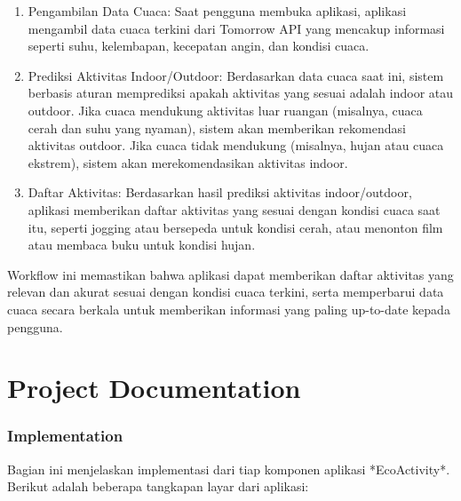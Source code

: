 \documentclass[journal,article,submit,pdftex,moreauthors]{Definitions/mdpi}
\begin{document}
\begin{enumerate}
    \item Pengambilan Data Cuaca: Saat pengguna membuka aplikasi, aplikasi mengambil data cuaca terkini dari Tomorrow API yang mencakup informasi seperti suhu, kelembapan, kecepatan angin, dan kondisi cuaca.
    \item Prediksi Aktivitas Indoor/Outdoor: Berdasarkan data cuaca saat ini, sistem berbasis aturan memprediksi apakah aktivitas yang sesuai adalah indoor atau outdoor. Jika cuaca mendukung aktivitas luar ruangan (misalnya, cuaca cerah dan suhu yang nyaman), sistem akan memberikan rekomendasi aktivitas outdoor. Jika cuaca tidak mendukung (misalnya, hujan atau cuaca ekstrem), sistem akan merekomendasikan aktivitas indoor.
    \item Daftar Aktivitas: Berdasarkan hasil prediksi aktivitas indoor/outdoor, aplikasi memberikan daftar aktivitas yang sesuai dengan kondisi cuaca saat itu, seperti jogging atau bersepeda untuk kondisi cerah, atau menonton film atau membaca buku untuk kondisi hujan.
\end{enumerate}

Workflow ini memastikan bahwa aplikasi dapat memberikan daftar aktivitas yang relevan dan akurat sesuai dengan kondisi cuaca terkini, serta memperbarui data cuaca secara berkala untuk memberikan informasi yang paling up-to-date kepada pengguna.

\section{Project Documentation}
\subsubsection{Implementation}

Bagian ini menjelaskan implementasi dari tiap komponen aplikasi *EcoActivity*. Berikut adalah beberapa tangkapan layar dari aplikasi:
\end{document}
